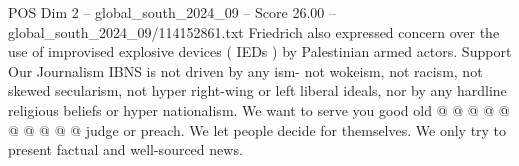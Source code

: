 \begin{textsample}{POS Dim 2 – global\_south\_2024\_09 – Score 26.00 – global\_south\_2024\_09/114152861.txt}
Friedrich also expressed concern over the use of improvised explosive devices ( IEDs ) by Palestinian armed actors.
Support Our Journalism IBNS is not driven by any ism- not wokeism, not racism, not skewed secularism, not hyper right-wing or left liberal ideals, nor by any hardline religious beliefs or hyper nationalism.
We want to serve you good old @ @ @ @ @ @ @ @ @ @ judge or preach.
We let people decide for themselves.
We only try to present factual and well-sourced news.

\end{textsample}
